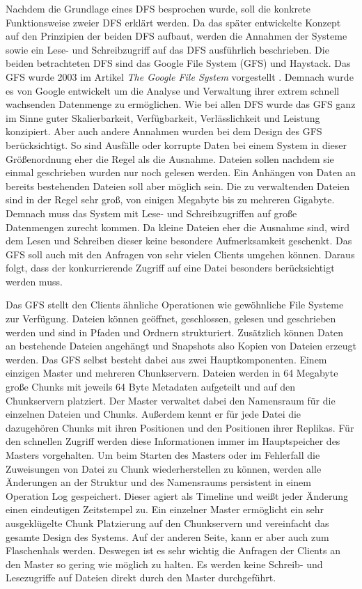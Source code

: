 \documentclass[12pt,oneside,a4paper,parskip]{scrbook}
\begin{document}
Nachdem die Grundlage eines DFS besprochen wurde, soll die konkrete Funktionsweise zweier DFS erklärt werden. Da das später entwickelte Konzept auf den Prinzipien der beiden DFS aufbaut, werden die Annahmen der Systeme sowie ein Lese- und Schreibzugriff auf das DFS ausführlich beschrieben. Die beiden betrachteten DFS sind das Google File System (GFS) und Haystack.
Das GFS wurde 2003 im Artikel \textit{The Google File System} vorgestellt \cite{GFS}. Demnach wurde es von Google entwickelt um die Analyse und Verwaltung ihrer extrem schnell wachsenden Datenmenge zu ermöglichen. Wie bei allen DFS wurde das GFS ganz im Sinne guter Skalierbarkeit, Verfügbarkeit, Verlässlichkeit und Leistung konzipiert. Aber auch andere Annahmen wurden bei dem Design des GFS berücksichtigt. So sind Ausfälle oder korrupte Daten bei einem System in dieser Größenordnung eher die Regel als die Ausnahme. Dateien sollen nachdem sie einmal geschrieben wurden nur noch gelesen werden. Ein Anhängen von Daten an bereits bestehenden Dateien soll aber möglich sein. Die zu verwaltenden Dateien sind in der Regel sehr groß, von einigen Megabyte bis zu mehreren Gigabyte. Demnach muss das System mit Lese- und Schreibzugriffen auf große Datenmengen zurecht kommen. Da kleine Dateien eher die Ausnahme sind, wird dem Lesen und Schreiben dieser keine besondere Aufmerksamkeit geschenkt. Das GFS soll auch mit den Anfragen von sehr vielen Clients umgehen können. Daraus folgt, dass der konkurrierende Zugriff auf eine Datei besonders berücksichtigt werden muss.  

Das GFS stellt den Clients ähnliche Operationen wie gewöhnliche File Systeme zur Verfügung. Dateien können geöffnet, geschlossen, gelesen und geschrieben werden und sind in Pfaden und Ordnern strukturiert. Zusätzlich können Daten an bestehende Dateien angehängt und Snapshots also Kopien von Dateien erzeugt werden. Das GFS selbst besteht dabei aus zwei Hauptkomponenten. Einem einzigen Master und mehreren Chunkservern. Dateien werden in 64 Megabyte große Chunks mit jeweils 64 Byte Metadaten aufgeteilt und auf den Chunkservern platziert. Der Master verwaltet dabei den Namensraum für die einzelnen Dateien und Chunks. Außerdem kennt er für jede Datei die dazugehören Chunks mit ihren Positionen und den Positionen ihrer Replikas. Für den schnellen Zugriff werden diese Informationen immer im Hauptspeicher des Masters vorgehalten. Um beim Starten des Masters oder im Fehlerfall die Zuweisungen von Datei zu Chunk wiederherstellen zu können, werden alle Änderungen an der Struktur und des Namensraums persistent in einem Operation Log gespeichert. Dieser agiert als Timeline und weißt jeder Änderung einen eindeutigen Zeitstempel zu. Ein einzelner Master ermöglicht ein sehr ausgeklügelte Chunk Platzierung auf den Chunkservern und vereinfacht das gesamte Design des Systems. Auf der anderen Seite, kann er aber auch zum Flaschenhals werden. Deswegen ist es sehr wichtig die Anfragen der Clients an den Master so gering wie möglich zu halten. Es werden keine Schreib- und Lesezugriffe auf Dateien direkt durch den Master durchgeführt.
\end{document}
